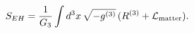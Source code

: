\begin{equation}
S_{EH} = \frac{1}{G_3} \int d^3x\, \sqrt{-g^{(3)}}\, (R^{(3)} + {\cal L}_{\rm matter}).
\end{equation}

